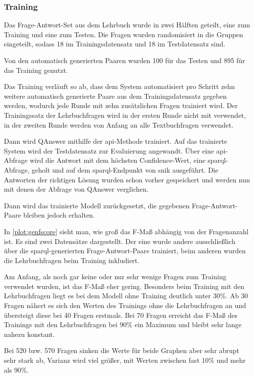 \subsubsection{Training}

Das Frage-Antwort-Set aus dem Lehrbuch wurde in zwei Hälften geteilt, eine zum Training und eine zum Testen.
Die Fragen wurden randomisiert in die Gruppen eingeteilt, sodass 18 im Trainingsdatensatz und 18 im Testdatensatz sind.

Von den automatisch generierten Paaren wurden 100 für das Testen und 895 für das Training genutzt.

Das Training verläuft so ab, dass dem System automatisiert pro Schritt zehn weitere automatisch generierte Paare aus dem Trainingsdatensatz gegeben werden,
wodurch jede Runde mit zehn zusätzlichen Fragen trainiert wird.
Der Trainingssatz der Lehrbuchfragen wird in der ersten Runde nicht mit verwendet,
in der zweiten Runde werden von Anfang an alle Textbuchfragen verwendet.

Dann wird QAnswer mithilfe der \ac{api}-Methode trainiert.
Auf das trainierte System wird der Testdatensatz zur Evaluierung angewandt.
Über eine \ac{api}-Abfrage wird die Antwort mit dem höchsten Confidence-Wert, eine \ac{sparql}-Abfrage, geholt und auf dem \ac{sparql}-Endpunkt von \ac{snik} ausgeführt.
Die Antworten der richtigen Lösung wurden schon vorher gespeichert und werden nun mit denen der Abfrage von QAnswer verglichen.

Dann wird das trainierte Modell zurückgesetzt, die gegebenen Frage-Antwort-Paare bleiben jedoch erhalten.

In \cref{plot:genfscore} sieht man, wie groß das F-Maß abhängig von der Fragenanzahl ist.
Es sind zwei Datensätze dargestellt.
Der eine wurde andere ausschließlich über die \ac{sparql}-generierten Frage-Antwort-Paare trainiert, beim anderen wurden die Lehrbuchfragen beim Training inkludiert.

Am Anfang, als noch gar keine oder nur sehr wenige Fragen zum Training verwendet wurden, ist das F-Maß eher gering.
Besonders beim Training mit den Lehrbuchfragen liegt es bei dem Modell ohne Training deutlich unter 30\%.
Ab 30 Fragen nähert es sich den Werten des Trainings ohne die Lehrbuchfragen an und übersteigt diese bei 40 Fragen erstmals.
Bei 70 Fragen erreicht das F-Maß des Trainings mit den Lehrbuchfragen bei 90\% ein Maximum und bleibt sehr lange nahezu konstant.

Bei 520 bzw. 570 Fragen sinken die Werte für beide Graphen aber sehr abrupt sehr stark ab, Varianz wird viel größer,
mit Werten zwischen fast 10\% und mehr als 90\%.

